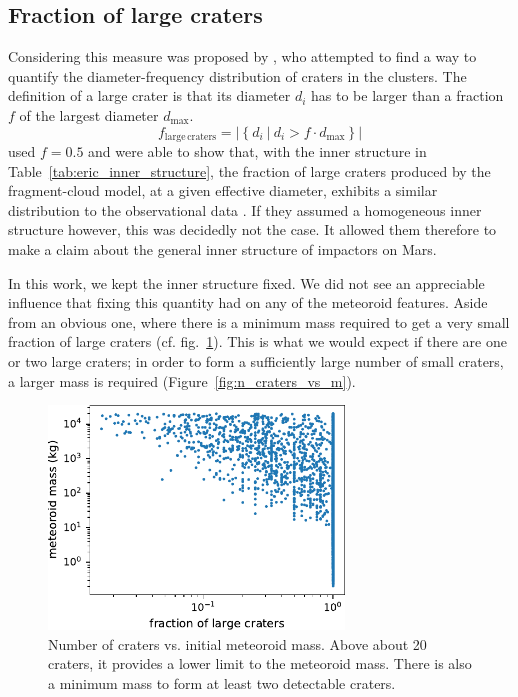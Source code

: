 \subsection{Fraction of large craters}
Considering this measure was proposed by \cite{newland2019CFM18}, who attempted to find a way to quantify the diameter-frequency distribution of craters in the clusters. The definition of a large crater is that its diameter $d_i$ has to be larger than a fraction $f$ of the largest diameter $d_\mathrm{max}$.
\begin{equation}
    f_\mathrm{large\,craters} = \left|\left\{d_i\ \big|\ d_i > f\cdot d_\mathrm{max}\right\}\right|
\end{equation}
\cite{newland2019CFM18} used $f = 0.5$ and were able to show that, with the inner structure in Table~\ref{tab:eric_inner_structure}, the fraction of large craters produced by the fragment-cloud model, at a given effective diameter, exhibits a similar distribution to the observational data \citep{daubar2019recently}. If they assumed a homogeneous inner structure however, this was decidedly not the case. It allowed them therefore to make a claim about the general inner structure of impactors on Mars.

In this work, we kept the inner structure fixed. We did not see an appreciable influence that fixing this quantity had on any of the meteoroid features.
Aside from an obvious one, where there is a minimum mass required to get a very small fraction of large craters (cf. fig.~\ref{fig:f_large_vs_mass}). This is what we would expect if there are one or two large craters; in order to form a sufficiently large number of small craters, a larger mass is required (Figure~\ref{fig:n_craters_vs_m}).

\begin{figure}
    \centering
    \includegraphics[width=0.7\textwidth]{figures/f_large_vs_mass}
    \caption{Number of craters vs. initial meteoroid mass. Above about 20 craters, it provides a lower limit to the meteoroid mass. There is also a minimum mass to form at least two detectable craters.}
    \label{fig:f_large_vs_mass}
\end{figure}


